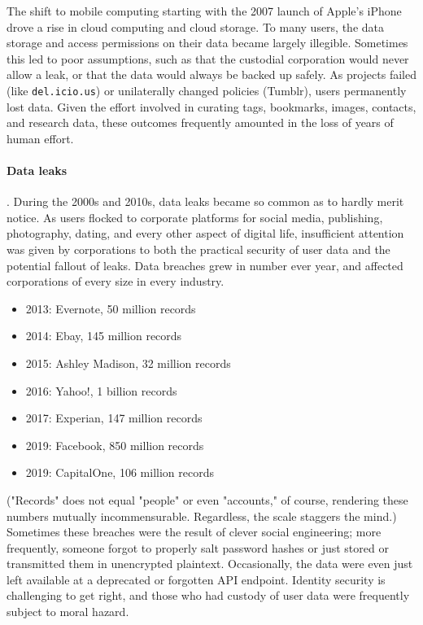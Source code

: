 The shift to mobile computing starting with the 2007 launch of Apple's iPhone drove a rise in cloud computing and cloud storage.  To many users, the data storage and access permissions on their data became largely illegible.  Sometimes this led to poor assumptions, such as that the custodial corporation would never allow a leak, or that the data would always be backed up safely.  As projects failed (like \texttt{del.icio.us}) or unilaterally changed policies (Tumblr), users permanently lost data.  Given the effort involved in curating tags, bookmarks, images, contacts, and research data, these outcomes frequently amounted in the loss of years of human effort.

\paragraph{Data leaks}.  During the 2000s and 2010s, data leaks became so common as to hardly merit notice.  As users flocked to corporate platforms for social media, publishing, photography, dating, and every other aspect of digital life, insufficient attention was given by corporations to both the practical security of user data and the potential fallout of leaks.  Data breaches grew in number ever year, and affected corporations of every size in every industry.

\begin{itemize}
  \item  2013:  Evernote, 50 million records
  \item  2014:  Ebay, 145 million records
  \item  2015:  Ashley Madison, 32 million records
  \item  2016:  Yahoo!, 1 billion records
  \item  2017:  Experian, 147 million records
  \item  2019:  Facebook, 850 million records
  \item  2019:  CapitalOne, 106 million records
\end{itemize}

("Records" does not equal "people" or even "accounts," of course, rendering these numbers mutually incommensurable.  Regardless, the scale staggers the mind.)  Sometimes these breaches were the result of clever social engineering; more frequently, someone forgot to properly salt password hashes or just stored or transmitted them in unencrypted plaintext.  Occasionally, the data were even just left available at a deprecated or forgotten API endpoint.  Identity security is challenging to get right, and those who had custody of user data were frequently subject to moral hazard.


